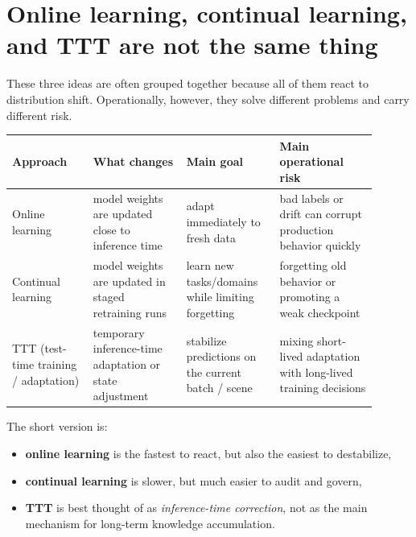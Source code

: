 \section{Online learning, continual learning, and TTT are not the same thing}

These three ideas are often grouped together because all of them react to distribution shift.
Operationally, however, they solve different problems and carry different risk.

\begin{center}
\begin{tabular}{@{}p{0.20\linewidth}p{0.23\linewidth}p{0.23\linewidth}p{0.24\linewidth}@{}}
\toprule
Approach & What changes & Main goal & Main operational risk \\
\midrule
Online learning & model weights are updated close to inference time & adapt immediately to fresh data & bad labels or drift can corrupt production behavior quickly \\
Continual learning & model weights are updated in staged retraining runs & learn new tasks/domains while limiting forgetting & forgetting old behavior or promoting a weak checkpoint \\
TTT (test-time training / adaptation) & temporary inference-time adaptation or state adjustment & stabilize predictions on the current batch / scene & mixing short-lived adaptation with long-lived training decisions \\
\bottomrule
\end{tabular}
\end{center}

The short version is:
\begin{itemize}
  \item \textbf{online learning} is the fastest to react, but also the easiest to destabilize,
  \item \textbf{continual learning} is slower, but much easier to audit and govern,
  \item \textbf{TTT} is best thought of as \emph{inference-time correction}, not as the main mechanism for long-term knowledge accumulation.
\end{itemize}

